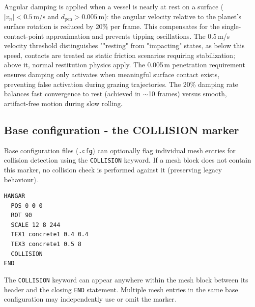 \documentclass[Orbiter Technical Reference.tex]{subfiles}
\begin{document}
Angular damping is applied when a vessel is nearly at rest on a surface
($|v_n| < 0.5\,\text{m/s}$ and $d_{\mathrm{pen}} > 0.005\,\text{m}$):
the angular velocity relative to the planet's surface rotation is reduced
by 20\% per frame. This compensates for the single-contact-point
approximation and prevents tipping oscillations.
The 0.5\,m/s velocity threshold distinguishes ""resting" from "impacting"
states, as below this speed, contacts are treated as static friction
scenarios requiring stabilization; above it, normal restitution physics
apply. The 0.005\,m penetration requirement ensures damping only activates
when meaningful surface contact exists, preventing false activation during
grazing trajectories. The 20\% damping rate balances fast convergence to
rest (achieved in $\sim$10 frames) versus smooth, artifact-free motion
during slow rolling.


\subsection{Base configuration - the COLLISION marker}
\label{ssec:cfg_collision}
Base configuration files (\texttt{.cfg}) can optionally flag individual
mesh entries for collision detection using the \texttt{COLLISION} keyword.
If a mesh block does not contain this marker, no collision check is
performed against it (preserving legacy behaviour).

\begin{lstlisting}[language=OSFS]
HANGAR
  POS 0 0 0
  ROT 90
  SCALE 12 8 244
  TEX1 concrete1 0.4 0.4
  TEX3 concrete1 0.5 8
  COLLISION
END
\end{lstlisting}

The \texttt{COLLISION} keyword can appear anywhere within the mesh block
between its header and the closing \texttt{END} statement.
Multiple mesh entries in the same base configuration may independently
use or omit the marker.
\end{document}
